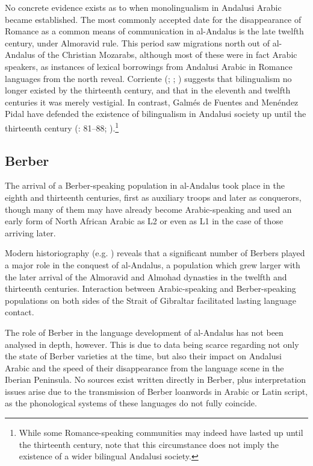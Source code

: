 \documentclass[output=paper,modfonts,nonflat]{langsci/langscibook}
\begin{document}
No concrete evidence exists as to when monolingualism in Andalusi Arabic became established. The most commonly accepted date for the disappearance of Romance as a common means of communication in al-Andalus is the late twelfth century, under Almoravid rule. This period saw migrations north out of al-Andalus of the Christian Mozarabs, although most of these were in fact Arabic speakers, as instances of lexical borrowings from Andalusi Arabic in Romance languages from the north reveal. Corriente (\citeyear{Corriente1997dictionary}; \citeyear[443]{Corriente1992book}; \citeyear{Corriente2005}) suggests that bilingualism no longer existed by the thirteenth century, and that in the eleventh and twelfth centuries it was merely vestigial. In contrast, Galmés de Fuentes and Menéndez Pidal have defended the existence of bilingualism in Andalusi society up until the thirteenth century (\citealt{GalmésdeFuentes1994}: 81–88; \citealt{MenéndezPidalGalmésdeFuentes2001}).\footnote{While some Romance-speaking communities may indeed have lasted up until the thirteenth century, note that this circumstance does not imply the existence of a wider bilingual Andalusi society.} 

\subsection{Berber}

The arrival of a Berber-speaking population in al-Andalus took place in the eighth and thirteenth centuries, first as auxiliary troops and later as conquerors, though many of them may have already become Arabic-speaking and used an early form of North African Arabic as L2 or even as L1 in the case of those arriving later. 

Modern historiography (e.g. \citealt{ManzanoMoreno1990,Guichard1995,Chalmeta2003}) reveals that a significant number of Berbers played a major role in the conquest of al-Andalus, a population which grew larger with the later arrival of the Almoravid and Almohad dynasties in the twelfth and thirteenth centuries. Interaction between Arabic-speaking and Berber-speaking populations on both sides of the Strait of Gibraltar facilitated lasting language contact. 

The role of Berber in the language development of al-Andalus has not been analysed in depth, however. This is due to data being scarce regarding not only the state of Berber varieties at the time, but also their impact on Andalusi Arabic and the speed of their disappearance from the language scene in the Iberian Peninsula. No sources exist written directly in Berber, plus interpretation issues arise due to the transmission of Berber loanwords in Arabic or Latin script, as the phonological systems of these languages do not fully coincide.  
\end{document}
